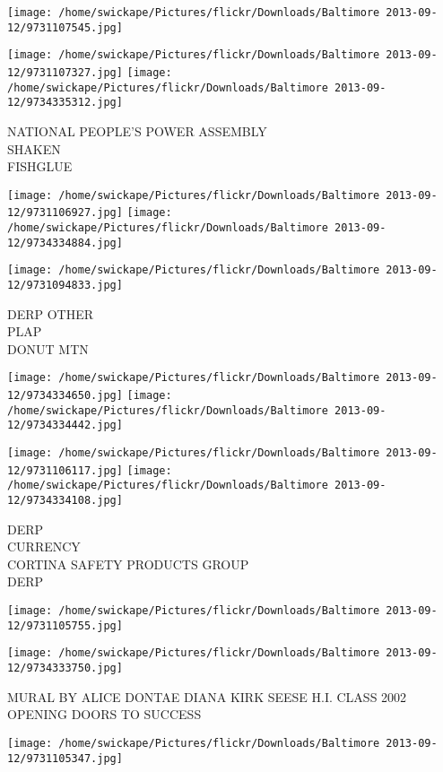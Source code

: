 \documentclass[10pt,letterpaper]{article}
\begin{document}
\texttt{[image: /home/swickape/Pictures/flickr/Downloads/Baltimore 2013-09-12/9731107545.jpg]}

\vspace{0.25in}
\texttt{[image: /home/swickape/Pictures/flickr/Downloads/Baltimore 2013-09-12/9731107327.jpg]}
\texttt{[image: /home/swickape/Pictures/flickr/Downloads/Baltimore 2013-09-12/9734335312.jpg]}

NATIONAL PEOPLE'S POWER ASSEMBLY\\
SHAKEN\\
FISHGLUE
\pagebreak

\texttt{[image: /home/swickape/Pictures/flickr/Downloads/Baltimore 2013-09-12/9731106927.jpg]}
\texttt{[image: /home/swickape/Pictures/flickr/Downloads/Baltimore 2013-09-12/9734334884.jpg]}

\vspace{0.25in}
\texttt{[image: /home/swickape/Pictures/flickr/Downloads/Baltimore 2013-09-12/9731094833.jpg]}

DERP OTHER\\
PLAP\\
DONUT MTN
\pagebreak

\texttt{[image: /home/swickape/Pictures/flickr/Downloads/Baltimore 2013-09-12/9734334650.jpg]}
\texttt{[image: /home/swickape/Pictures/flickr/Downloads/Baltimore 2013-09-12/9734334442.jpg]}

\texttt{[image: /home/swickape/Pictures/flickr/Downloads/Baltimore 2013-09-12/9731106117.jpg]}
\texttt{[image: /home/swickape/Pictures/flickr/Downloads/Baltimore 2013-09-12/9734334108.jpg]}

DERP\\
CURRENCY\\
CORTINA SAFETY PRODUCTS GROUP\\
DERP
\pagebreak

\texttt{[image: /home/swickape/Pictures/flickr/Downloads/Baltimore 2013-09-12/9731105755.jpg]}

\vspace{0.25in}
\texttt{[image: /home/swickape/Pictures/flickr/Downloads/Baltimore 2013-09-12/9734333750.jpg]}

MURAL BY ALICE DONTAE DIANA KIRK SEESE H.I. CLASS 2002\\
OPENING DOORS TO SUCCESS
\pagebreak

\texttt{[image: /home/swickape/Pictures/flickr/Downloads/Baltimore 2013-09-12/9731105347.jpg]}
\end{document}
